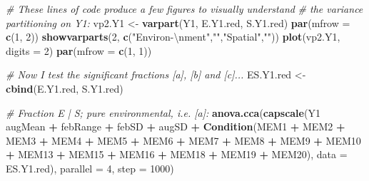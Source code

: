 \documentclass[10pt,A4,]{article}
\newenvironment{Shaded}{\begin{snugshade}}{\end{snugshade}}
\newcommand{\KeywordTok}[1]{\textcolor[rgb]{0.13,0.29,0.53}{\textbf{#1}}}
\newcommand{\DataTypeTok}[1]{\textcolor[rgb]{0.13,0.29,0.53}{#1}}
\newcommand{\DecValTok}[1]{\textcolor[rgb]{0.00,0.00,0.81}{#1}}
\newcommand{\CharTok}[1]{\textcolor[rgb]{0.31,0.60,0.02}{#1}}
\newcommand{\StringTok}[1]{\textcolor[rgb]{0.31,0.60,0.02}{#1}}
\newcommand{\CommentTok}[1]{\textcolor[rgb]{0.56,0.35,0.01}{\textit{#1}}}
\newcommand{\OperatorTok}[1]{\textcolor[rgb]{0.81,0.36,0.00}{\textbf{#1}}}
\newcommand{\NormalTok}[1]{#1}
\begin{document}
\begin{Shaded}
\begin{Highlighting}[]
\CommentTok{# These lines of code produce a few figures to visually understand}
\CommentTok{# the variance partitioning on Y1:}
\NormalTok{vp2.Y1 <-}\StringTok{ }\KeywordTok{varpart}\NormalTok{(Y1, E.Y1.red, S.Y1.red)}
\KeywordTok{par}\NormalTok{(}\DataTypeTok{mfrow =} \KeywordTok{c}\NormalTok{(}\DecValTok{1}\NormalTok{, }\DecValTok{2}\NormalTok{))}
\KeywordTok{showvarparts}\NormalTok{(}\DecValTok{2}\NormalTok{, }\KeywordTok{c}\NormalTok{(}\StringTok{"Environ-}\CharTok{\textbackslash{}n}\StringTok{ment"}\NormalTok{,}\StringTok{""}\NormalTok{,}\StringTok{"Spatial"}\NormalTok{,}\StringTok{""}\NormalTok{))}
\KeywordTok{plot}\NormalTok{(vp2.Y1, }\DataTypeTok{digits =} \DecValTok{2}\NormalTok{)}
\KeywordTok{par}\NormalTok{(}\DataTypeTok{mfrow =} \KeywordTok{c}\NormalTok{(}\DecValTok{1}\NormalTok{, }\DecValTok{1}\NormalTok{))}

\CommentTok{# Now I test the significant fractions [a], [b] and [c]...}
\NormalTok{ES.Y1.red <-}\StringTok{ }\KeywordTok{cbind}\NormalTok{(E.Y1.red, S.Y1.red)}

\CommentTok{# Fraction E | S; pure environmental, i.e. [a]:}
\KeywordTok{anova.cca}\NormalTok{(}\KeywordTok{capscale}\NormalTok{(Y1 }\OperatorTok{~}\StringTok{ }\NormalTok{augMean }\OperatorTok{+}\StringTok{ }\NormalTok{febRange }\OperatorTok{+}\StringTok{ }\NormalTok{febSD }\OperatorTok{+}\StringTok{ }\NormalTok{augSD }\OperatorTok{+}
\StringTok{                  }\KeywordTok{Condition}\NormalTok{(MEM1 }\OperatorTok{+}\StringTok{ }\NormalTok{MEM2 }\OperatorTok{+}\StringTok{ }\NormalTok{MEM3 }\OperatorTok{+}\StringTok{ }\NormalTok{MEM4 }\OperatorTok{+}\StringTok{ }\NormalTok{MEM5 }\OperatorTok{+}
\StringTok{                              }\NormalTok{MEM6 }\OperatorTok{+}\StringTok{ }\NormalTok{MEM7 }\OperatorTok{+}\StringTok{ }\NormalTok{MEM8 }\OperatorTok{+}\StringTok{ }\NormalTok{MEM9 }\OperatorTok{+}\StringTok{ }\NormalTok{MEM10 }\OperatorTok{+}
\StringTok{                              }\NormalTok{MEM13 }\OperatorTok{+}\StringTok{ }\NormalTok{MEM15 }\OperatorTok{+}\StringTok{ }\NormalTok{MEM16 }\OperatorTok{+}
\StringTok{                              }\NormalTok{MEM18 }\OperatorTok{+}\StringTok{ }\NormalTok{MEM19 }\OperatorTok{+}\StringTok{ }\NormalTok{MEM20),}
                \DataTypeTok{data =}\NormalTok{ ES.Y1.red), }\DataTypeTok{parallel =} \DecValTok{4}\NormalTok{, }\DataTypeTok{step =} \DecValTok{1000}\NormalTok{)}


\end{Highlighting}
\end{Shaded}
\end{document}
